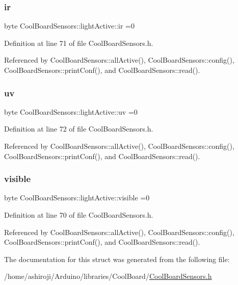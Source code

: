 \subsubsection{\texorpdfstring{ir}{ir}}
{\footnotesize\ttfamily byte Cool\+Board\+Sensors\+::light\+Active\+::ir =0}



Definition at line 71 of file Cool\+Board\+Sensors.\+h.



Referenced by Cool\+Board\+Sensors\+::all\+Active(), Cool\+Board\+Sensors\+::config(), Cool\+Board\+Sensors\+::print\+Conf(), and Cool\+Board\+Sensors\+::read().

\mbox{\label{structCoolBoardSensors_1_1lightActive_a949a7aaf5166d981de8fe0fd93da20d6}} 
\subsubsection{\texorpdfstring{uv}{uv}}
{\footnotesize\ttfamily byte Cool\+Board\+Sensors\+::light\+Active\+::uv =0}



Definition at line 72 of file Cool\+Board\+Sensors.\+h.



Referenced by Cool\+Board\+Sensors\+::all\+Active(), Cool\+Board\+Sensors\+::config(), Cool\+Board\+Sensors\+::print\+Conf(), and Cool\+Board\+Sensors\+::read().

\mbox{\label{structCoolBoardSensors_1_1lightActive_abcbba296b6a95e67c0cd2555d9dd50c7}} 
\subsubsection{\texorpdfstring{visible}{visible}}
{\footnotesize\ttfamily byte Cool\+Board\+Sensors\+::light\+Active\+::visible =0}



Definition at line 70 of file Cool\+Board\+Sensors.\+h.



Referenced by Cool\+Board\+Sensors\+::all\+Active(), Cool\+Board\+Sensors\+::config(), Cool\+Board\+Sensors\+::print\+Conf(), and Cool\+Board\+Sensors\+::read().



The documentation for this struct was generated from the following file\+:\begin{DoxyCompactItemize}
\item 
/home/ashiroji/\+Arduino/libraries/\+Cool\+Board/\hyperlink{CoolBoardSensors_8h}{Cool\+Board\+Sensors.\+h}\end{DoxyCompactItemize}
